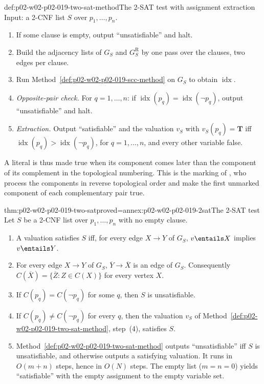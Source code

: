 \begin{hbmethod}{def:p02-w02-p02-019-two-sat-method}{The 2-SAT test with assignment extraction}
Input: a 2-CNF list \(S\) over \(p_1,\ldots,p_n\).
\begin{enumerate}
  \item[(0)] If some clause is empty, output ``unsatisfiable'' and halt.
  \item[(1)] Build the adjacency lists of \(G_S\) and \(G_S^{\mathrm R}\) by
        one pass over the clauses, two edges per clause.
  \item[(2)] Run Method~\ref{def:p02-w02-p02-019-scc-method} on \(G_S\) to
        obtain \(\operatorname{idx}\).
  \item[(3)] \emph{Opposite-pair check.}  For \(q=1,\ldots,n\): if
        \(\operatorname{idx}(p_q)=\operatorname{idx}(\neg p_q)\), output
        ``unsatisfiable'' and halt.
  \item[(4)] \emph{Extraction.}  Output ``satisfiable'' and the valuation
        \(v_S\) with \(v_S(p_q)=\mathbf{T}\) iff
        \(\operatorname{idx}(p_q)>\operatorname{idx}(\neg p_q)\), for
        \(q=1,\ldots,n\), and every other variable false.
\end{enumerate}
A literal is thus made true when its component comes later than the
component of its complement in the topological numbering.  This is the
marking of \textcite[122]{AspvallPlassTarjan1979}, who process the components
in reverse topological order and make the first unmarked component of each
complementary pair true.
\end{hbmethod}

\begin{hbtheorem}{thm:p02-w02-p02-019-two-sat}{proved=annex:p02-w02-p02-019-2sat}{The 2-SAT test}
Let \(S\) be a 2-CNF list over \(p_1,\ldots,p_n\) with no empty clause.
\begin{enumerate}
  \item A valuation satisfies \(S\) iff, for every edge \(X\to Y\) of
        \(G_S\), \(v\entails X\) implies \(v\entails Y\).
  \item For every edge \(X\to Y\) of \(G_S\), \(\overline Y\to\overline X\) is
        an edge of \(G_S\).  Consequently \(C(\overline X)=\{\overline Z:
        Z\in C(X)\}\) for every vertex \(X\).
  \item If \(C(p_q)=C(\neg p_q)\) for some \(q\), then \(S\) is
        unsatisfiable.
  \item If \(C(p_q)\neq C(\neg p_q)\) for every \(q\), then the valuation
        \(v_S\) of Method~\ref{def:p02-w02-p02-019-two-sat-method}, step~(4),
        satisfies \(S\).
  \item Method~\ref{def:p02-w02-p02-019-two-sat-method} outputs
        ``unsatisfiable'' iff \(S\) is unsatisfiable, and otherwise outputs a
        satisfying valuation.  It runs in \(O(m+n)\) steps, hence in \(O(N)\)
        steps.  The empty list (\(m=n=0\)) yields ``satisfiable'' with the
        empty assignment to the empty variable set.
\end{enumerate}
\end{hbtheorem}

